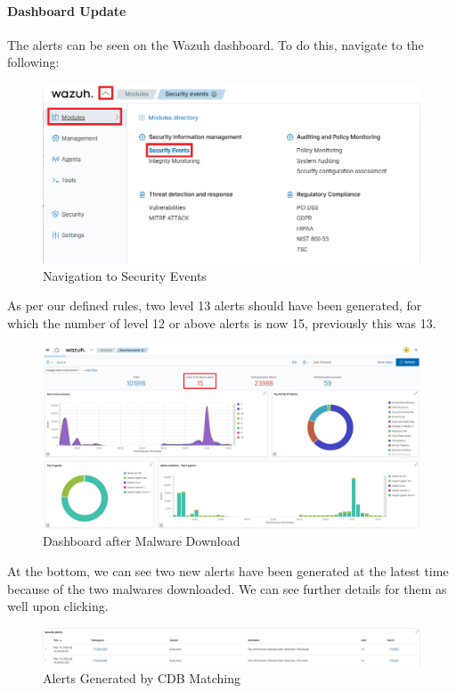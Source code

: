 \paragraph{Dashboard Update}
\label{navigate-sec}
The alerts can be seen on the Wazuh dashboard. To do this, navigate to the following:
    \begin{figure}[H]
        \centering
        \includegraphics[width=\textwidth]{images/malware-detection/cdb/8.png}
        \caption{Navigation to Security Events}
        \label{fig:navigate-security}
    \end{figure}
As per our defined rules, two level 13 alerts should have been generated, for which the number of level 12 or above alerts is now 15, previously this was 13.
    \begin{figure}[H]
        \centering
        \includegraphics[width=\textwidth]{images/malware-detection/cdb/10.png}
        \caption{Dashboard after Malware Download}
        \label{fig:cdb-post-malware-download}
    \end{figure}
At the bottom, we can see two new alerts have been generated at the latest time because of the two malwares downloaded. We can see further details for them as well upon clicking.
    \begin{figure}[H]
        \centering
        \includegraphics[width=\textwidth]{images/malware-detection/cdb/9.png}
        \caption{Alerts Generated by CDB Matching}
        \label{fig:cdb-alerts}
    \end{figure}

